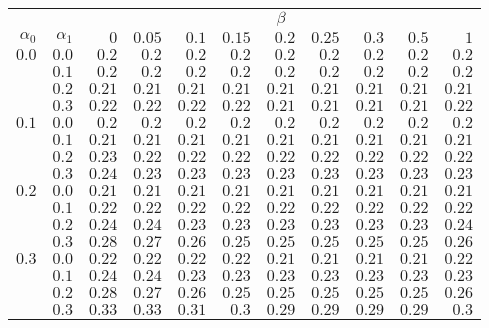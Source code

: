 \begin{tabular}{rr|rrrrrrrrr}
\hline\hline
 && \multicolumn{9}{c}{$\beta$}\\
 $\alpha_0$ & $\alpha_1$ & $0$ & $0.05$ & $0.1$ & $0.15$ & $0.2$ & $0.25$ & $0.3$ & $0.5$ & $1$ \\ 
 \hline
$0.0$ & $0.0$ & $0.2$ & $0.2$ & $0.2$ & $0.2$ & $0.2$ & $0.2$ & $0.2$ & $0.2$ & $0.2$\\ 
 & $0.1$ & $0.2$ & $0.2$ & $0.2$ & $0.2$ & $0.2$ & $0.2$ & $0.2$ & $0.2$ & $0.2$\\ 
 & $0.2$ & $0.21$ & $0.21$ & $0.21$ & $0.21$ & $0.21$ & $0.21$ & $0.21$ & $0.21$ & $0.21$\\ 
 & $0.3$ & $0.22$ & $0.22$ & $0.22$ & $0.22$ & $0.21$ & $0.21$ & $0.21$ & $0.21$ & $0.22$\\ 
\hline 
 $0.1$ & $0.0$ & $0.2$ & $0.2$ & $0.2$ & $0.2$ & $0.2$ & $0.2$ & $0.2$ & $0.2$ & $0.2$\\ 
 & $0.1$ & $0.21$ & $0.21$ & $0.21$ & $0.21$ & $0.21$ & $0.21$ & $0.21$ & $0.21$ & $0.21$\\ 
 & $0.2$ & $0.23$ & $0.22$ & $0.22$ & $0.22$ & $0.22$ & $0.22$ & $0.22$ & $0.22$ & $0.22$\\ 
 & $0.3$ & $0.24$ & $0.23$ & $0.23$ & $0.23$ & $0.23$ & $0.23$ & $0.23$ & $0.23$ & $0.23$\\ 
\hline 
 $0.2$ & $0.0$ & $0.21$ & $0.21$ & $0.21$ & $0.21$ & $0.21$ & $0.21$ & $0.21$ & $0.21$ & $0.21$\\ 
 & $0.1$ & $0.22$ & $0.22$ & $0.22$ & $0.22$ & $0.22$ & $0.22$ & $0.22$ & $0.22$ & $0.22$\\ 
 & $0.2$ & $0.24$ & $0.24$ & $0.23$ & $0.23$ & $0.23$ & $0.23$ & $0.23$ & $0.23$ & $0.24$\\ 
 & $0.3$ & $0.28$ & $0.27$ & $0.26$ & $0.25$ & $0.25$ & $0.25$ & $0.25$ & $0.25$ & $0.26$\\ 
\hline 
 $0.3$ & $0.0$ & $0.22$ & $0.22$ & $0.22$ & $0.22$ & $0.21$ & $0.21$ & $0.21$ & $0.21$ & $0.22$\\ 
 & $0.1$ & $0.24$ & $0.24$ & $0.23$ & $0.23$ & $0.23$ & $0.23$ & $0.23$ & $0.23$ & $0.23$\\ 
 & $0.2$ & $0.28$ & $0.27$ & $0.26$ & $0.25$ & $0.25$ & $0.25$ & $0.25$ & $0.25$ & $0.26$\\ 
 & $0.3$ & $0.33$ & $0.33$ & $0.31$ & $0.3$ & $0.29$ & $0.29$ & $0.29$ & $0.29$ & $0.3$\\ 
 \hline 
 \end{tabular}